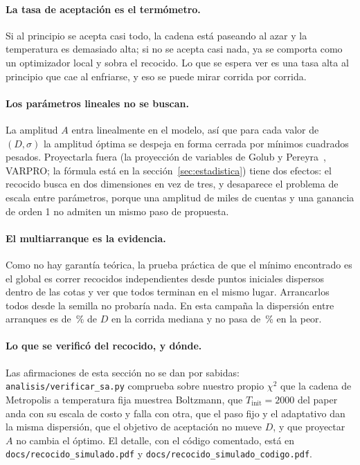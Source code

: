 \documentclass[11pt,a4paper]{article}
\begin{document}
\paragraph{La tasa de aceptación es el termómetro.} Si al principio se acepta
casi todo, la cadena está paseando al azar y la temperatura es demasiado alta;
si no se acepta casi nada, ya se comporta como un optimizador local y sobra el
recocido. Lo que se espera ver es una tasa alta al principio que cae al
enfriarse, y eso se puede mirar corrida por corrida.

\paragraph{Los parámetros lineales no se buscan.} La amplitud $A$ entra
linealmente en el modelo, así que para cada valor de $(D, \sigma)$ la amplitud
óptima se despeja en forma cerrada por mínimos cuadrados pesados. Proyectarla
fuera (la proyección de variables de Golub y Pereyra~\cite{golub1973}, VARPRO;
la fórmula está en la sección~\ref{sec:estadistica}) tiene dos efectos: el recocido
busca en dos dimensiones en vez de tres, y desaparece el problema de escala
entre parámetros, porque una amplitud de miles de cuentas y una ganancia de
orden 1 no admiten un mismo paso de propuesta.

\paragraph{El multiarranque es la evidencia.} Como no hay garantía teórica, la
prueba práctica de que el mínimo encontrado es el global es correr
\NArranques{} recocidos independientes desde puntos iniciales dispersos dentro
de las cotas y ver que todos terminan en el mismo lugar. Arrancarlos todos
desde la semilla no probaría nada. En esta campaña la dispersión entre
arranques es de \DispersionMediana\,\% de $D$ en la corrida mediana y no pasa
de \DispersionMax\,\% en la peor.

\paragraph{Lo que se verificó del recocido, y dónde.} Las afirmaciones de
esta sección no se dan por sabidas: \texttt{analisis/verificar\_sa.py}
comprueba sobre nuestro propio $\chi^2$ que la cadena de Metropolis a
temperatura fija muestrea Boltzmann, que $T_{\text{init}} = 2000$ del paper
anda con su escala de costo y falla con otra, que el paso fijo y el
adaptativo dan la misma dispersión, que el objetivo de aceptación no mueve
$D$, y que proyectar $A$ no cambia el óptimo. El detalle, con el código
comentado, está en \texttt{docs/recocido\_simulado.pdf} y
\texttt{docs/recocido\_simulado\_codigo.pdf}.
\end{document}
